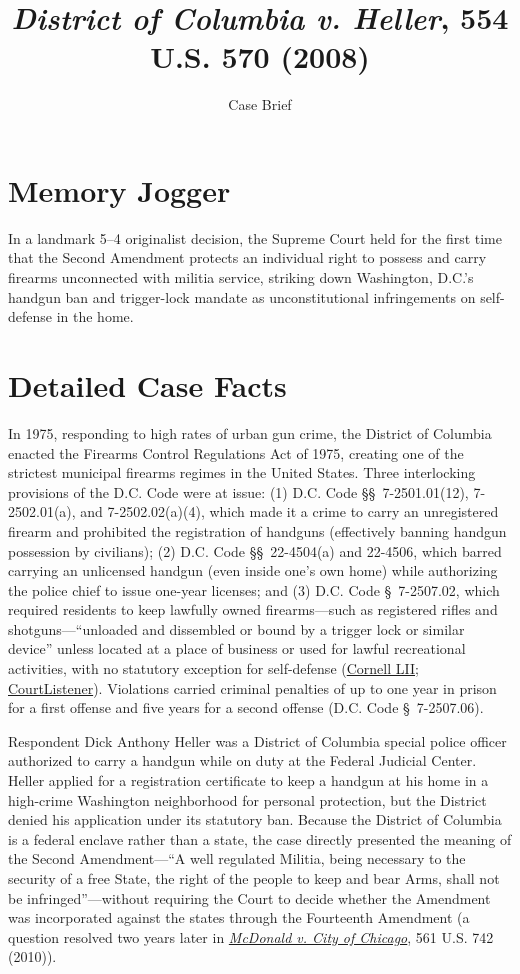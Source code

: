 \documentclass[12pt]{article}
\title{\textit{District of Columbia v. Heller}, 554 U.S. 570 (2008)}
\subtitle{Case Brief}
\author{}
\date{}
\begin{document}
\maketitle

\section{Memory Jogger}
In a landmark 5--4 originalist decision, the Supreme Court held for the first time that the Second Amendment protects an individual right to possess and carry firearms unconnected with militia service, striking down Washington, D.C.'s handgun ban and trigger-lock mandate as unconstitutional infringements on self-defense in the home.

\section{Detailed Case Facts}
In 1975, responding to high rates of urban gun crime, the District of Columbia enacted the Firearms Control Regulations Act of 1975, creating one of the strictest municipal firearms regimes in the United States. Three interlocking provisions of the D.C. Code were at issue: (1) D.C. Code \S\S\ 7-2501.01(12), 7-2502.01(a), and 7-2502.02(a)(4), which made it a crime to carry an unregistered firearm and prohibited the registration of handguns (effectively banning handgun possession by civilians); (2) D.C. Code \S\S\ 22-4504(a) and 22-4506, which barred carrying an unlicensed handgun (even inside one's own home) while authorizing the police chief to issue one-year licenses; and (3) D.C. Code \S\ 7-2507.02, which required residents to keep lawfully owned firearms---such as registered rifles and shotguns---``unloaded and dissembled or bound by a trigger lock or similar device'' unless located at a place of business or used for lawful recreational activities, with no statutory exception for self-defense (\href{https://www.law.cornell.edu/supct/html/07-290.ZO.html}{Cornell LII}; \href{https://www.courtlistener.com/opinion/145777/district-of-columbia-v-heller/}{CourtListener}). Violations carried criminal penalties of up to one year in prison for a first offense and five years for a second offense (D.C. Code \S\ 7-2507.06).

Respondent Dick Anthony Heller was a District of Columbia special police officer authorized to carry a handgun while on duty at the Federal Judicial Center. Heller applied for a registration certificate to keep a handgun at his home in a high-crime Washington neighborhood for personal protection, but the District denied his application under its statutory ban. Because the District of Columbia is a federal enclave rather than a state, the case directly presented the meaning of the Second Amendment---``A well regulated Militia, being necessary to the security of a free State, the right of the people to keep and bear Arms, shall not be infringed''---without requiring the Court to decide whether the Amendment was incorporated against the states through the Fourteenth Amendment (a question resolved two years later in \href{https://supreme.justia.com/cases/federal/us/561/742/}{\textit{McDonald v. City of Chicago}}, 561 U.S. 742 (2010)).
\end{document}
